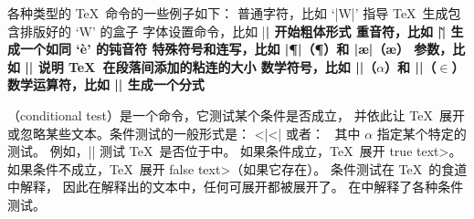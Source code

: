 {%
各种类型的 \TeX\ 命令的一些例子如下：
\ulist\compact
\li 普通字符，比如 `|W|' 指导 \TeX\ 生成包含排版好的 `W' 的盒子
\li 字体设置命令，比如 |\bf| 开始粗体形式
\li 重音符，比如 |\`| 生成一个如同 `\`e' 的钝音符
\li 特殊符号和连写，比如 |\P|（\P ）和 |\ae|（\ae ）
\li 参数，比如 |\parskip| 说明 \TeX\ 在段落间添加的粘连的大小
\li 数学符号，比如 |\alpha|（$\alpha$）和 |\in|（$\in$）
\li 数学运算符，比如 |\over| 生成一个分式
\endulist
\endconcept



%
{}（conditional test）是一个命令，它测试某个条件是否成立，
并依此让 \TeX\ 展开或忽略某些文本。条件测试的一般形式是：
^^|\else|^^|\fi|
\noindent 或者：\hfil\
\noindent 其中 $\alpha$ 指定某个特定的测试。
例如，|\ifvmode| 测试 \TeX\ 是否位于中。
如果条件成立，\TeX\ 展开 \<true text>。
如果条件不成立，\TeX\ 展开 \<false text>（如果它存在）。
条件测试在 \TeX\ 的食道\seeconcept{\anatomy}中解释，
因此在解释出的文本中，任何可展开都被展开了。
在中解释了各种条件测试。
\endconcept


}
